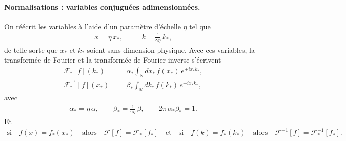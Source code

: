 



\paragraph{Normalisations : variables conjuguées adimensionnées.}

On réécrit les variables à l’aide d’un paramètre d’échelle $\eta$ tel que
\begin{eqnarray}
    x = \eta\, x_\ast,
    & \quad &
    k = \frac{1}{\gamma \eta}\, k_\ast,
\end{eqnarray}
de telle sorte que $x_\ast$ et $k_\ast$ soient sans dimension physique. 
Avec ces variables, la transformée de Fourier et la transformée de Fourier inverse s’écrivent
\begin{eqnarray}
    \mathcal F_\ast[f](k_\ast)  
    &=& \alpha_\ast \int_{\mathbb R} d x_\ast\, f(x_\ast)\, e^{\mp i x_\ast k_\ast}, \\
    \mathcal F_\ast^{-1}[f](x_\ast) 
    &=& \beta_\ast \int_{\mathbb R} d k_\ast\, f(k_\ast)\, e^{\pm i x_\ast k_\ast},
\end{eqnarray}
avec
\begin{eqnarray}
    \alpha_\ast = \eta\, \alpha,
    \qquad
    \beta_\ast = \frac{1}{\gamma \eta}\, \beta,
    \qquad
    2\pi\, \alpha_\ast \beta_\ast = 1.
\end{eqnarray}
Et
\begin{eqnarray}
    \mbox{si} \quad f(x) = f_\ast(x_\ast) \quad \mbox{alors} \quad \mathcal F[f] = \mathcal F_\ast[f_\ast]
    \quad
    \mbox{et}
    \quad
    \mbox{si} \quad f(k) = f_\ast(k_\ast) \quad \mbox{alors} \quad \mathcal F^{-1}[f] = \mathcal F_\ast^{-1}[f_\ast].
\end{eqnarray}    


